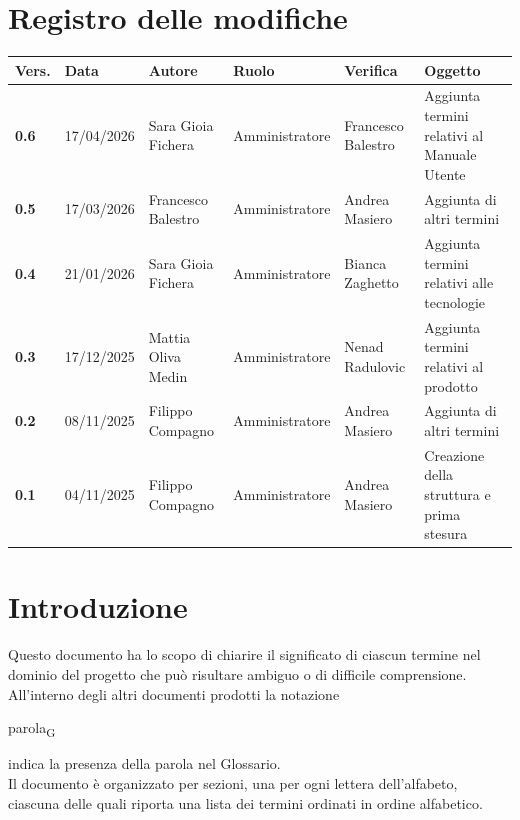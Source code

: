 \documentclass[a4paper,12pt]{article}
\begin{document}
    

        \newpage
        \section*{Registro delle modifiche} {
        \begin{table}[h!]
            \begin{tabularx}{\textwidth}{|l|l|l|l|L|L|}
                \hline
                \textbf{Vers.} & \textbf{Data} & \textbf{Autore} & \textbf{Ruolo} & \textbf{Verifica} & \textbf{Oggetto} \\
                \hline
                \textbf{0.6} & 17/04/2026 & Sara Gioia Fichera & Amministratore & Francesco Balestro & Aggiunta termini relativi al Manuale Utente\\
                \hline
                \textbf{0.5} & 17/03/2026 & Francesco Balestro & Amministratore & Andrea Masiero & Aggiunta di altri termini \\
                \hline
                \textbf{0.4} & 21/01/2026 & Sara Gioia Fichera & Amministratore & Bianca Zaghetto & Aggiunta termini relativi alle tecnologie \\
                \hline
                \textbf{0.3} & 17/12/2025 & Mattia Oliva Medin & Amministratore & Nenad Radulovic & Aggiunta termini relativi al prodotto \\
                \hline
                \textbf{0.2} & 08/11/2025 & Filippo Compagno & Amministratore & Andrea Masiero & Aggiunta di altri termini \\
                \hline
                \textbf{0.1} & 04/11/2025 & Filippo Compagno & Amministratore & Andrea Masiero & Creazione della struttura e prima stesura \\
                \hline
            \end{tabularx}
            \end{table}
        }
        \newpage

        \tableofcontents
        \newpage

        \section*{Introduzione} {
            Questo documento ha lo scopo di chiarire il significato di ciascun termine nel dominio del progetto che può risultare ambiguo o di difficile comprensione.\\
            All'interno degli altri documenti prodotti la notazione
            \begin{center}
                parola\textsubscript{G}
            \end{center}
            indica la presenza della parola nel Glossario.\\
            Il documento è organizzato per sezioni, una per ogni lettera dell'alfabeto, ciascuna delle quali riporta una lista dei termini ordinati in ordine alfabetico.
        }
        \newpage
\end{document}
